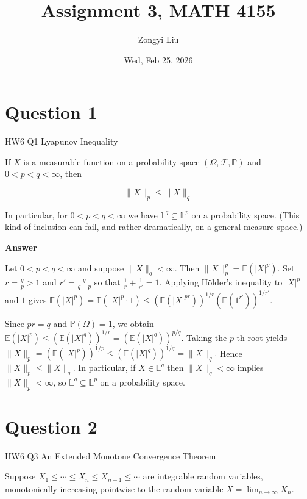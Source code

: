 \documentclass[letterpaper]{article}
\title{Assignment 3, MATH 4155}
\author{Zongyi Liu}
\date{Wed, Feb 25, 2026}
\begin{document}
		\maketitle
		
		\section{Question 1}
		
		{\color{deepred} HW6 Q1 Lyapunov Inequality}
		
		If $X$ is a measurable function on a probability space $(\Omega, \mathcal{F}, \mathbb{P})$ and $0<p<q<\infty$, then
		
		$$
		\|X\|_{p} \leq\|X\|_{q}
		$$
		
		In particular, for $0<p<q<\infty$ we have $\mathbb{L}^{q} \subseteq \mathbb{L}^{p}$ on a probability space. (This kind of inclusion can fail, and rather dramatically, on a general measure space.)
		
		
		
		\textbf{Answer}
		
			Let $0<p<q<\infty$ and suppose $\|X\|_q<\infty$. Then
			$\|X\|_p^p=\mathbb E(|X|^p)$.
			Set $r=\frac{q}{p}>1$ and $r'=\frac{q}{q-p}$ so that $\frac1r+\frac1{r'}=1$.
			Applying Hölder's inequality to $|X|^p$ and $1$ gives
			$
			\mathbb E(|X|^p)
			=\mathbb E(|X|^p\cdot 1)
			\le
			\left(\mathbb E(|X|^{pr})\right)^{1/r}
			\left(\mathbb E(1^{r'})\right)^{1/r'} .
			$
			
			Since $pr=q$ and $\mathbb P(\Omega)=1$, we obtain
			$
			\mathbb E(|X|^p)
			\le
			\left(\mathbb E(|X|^q)\right)^{1/r}
			=
			\left(\mathbb E(|X|^q)\right)^{p/q}.
			$ Taking the $p$-th root yields
			$
			\|X\|_p
			=
			\left(\mathbb E(|X|^p)\right)^{1/p}
			\le
			\left(\mathbb E(|X|^q)\right)^{1/q}
			=
			\|X\|_q .
			$ 
			Hence $\|X\|_p\le \|X\|_q$. In particular, if $X\in\mathbb L^q$ then
			$\|X\|_q<\infty$ implies $\|X\|_p<\infty$, so $\mathbb L^q\subseteq\mathbb L^p$
			on a probability space.
		
		\clearpage
		
		\section{Question 2}
		
		{\color{deepred} HW6 Q3 An Extended Monotone Convergence Theorem}
		
		Suppose $X_{1} \leq \cdots \leq X_{n} \leq X_{n+1} \leq \cdots$ are integrable random variables, monotonically increasing pointwise to the random variable $X=\lim _{n \rightarrow \infty} X_{n}$.
		
\end{document}
